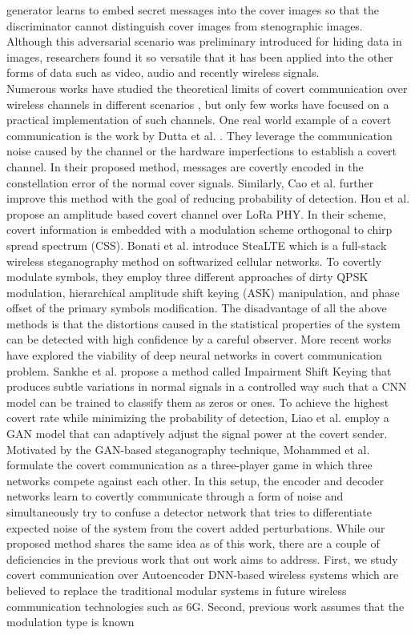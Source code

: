 generator learns to embed secret messages into the cover images so that the discriminator cannot distinguish cover images from stenographic images. Although this adversarial scenario was preliminary introduced for hiding data in images, researchers found it so versatile that it has been applied into the other forms of data such as video, audio and recently wireless signals.\\
Numerous works have studied the theoretical limits of covert communication over wireless channels in different scenarios \cite{bash2012square, soltani2018covert, sheikholeslami2018multi, li2021fundamental}, but only few works have focused on a practical implementation of such channels. One real world example of a covert communication is the work by Dutta et al. \cite{dutta2012secret}. They leverage the communication noise caused by the channel or the hardware imperfections to establish a covert channel. In their proposed method, messages are covertly encoded in the constellation error of the normal cover signals. Similarly, Cao et al. \cite{cao2018wireless} further improve this method with the goal of reducing probability of detection. Hou et al. \cite{hou2020cloaklora} propose an amplitude based covert channel over LoRa PHY. In their scheme, covert information is embedded with a modulation scheme orthogonal to chirp spread spectrum (CSS). Bonati et al. \cite{bonati2021stealte} introduce SteaLTE which is a full-stack wireless steganography method on softwarized cellular networks. To covertly modulate symbols, they employ three different approaches of dirty QPSK modulation, hierarchical amplitude shift keying (ASK) manipulation, and phase offset of the primary symbols modification. The disadvantage of all the above methods is that the distortions caused in the statistical properties of the system can be detected with high confidence by a careful observer. More recent works have explored the viability of deep neural networks in covert communication problem. Sankhe et al. \cite{sankhe2019impairment} propose a method called Impairment Shift Keying that produces subtle variations in normal signals in a controlled way such that a CNN model can be trained to classify them as zeros or ones. To achieve the highest covert rate while minimizing the probability of detection, Liao et al. \cite{liao2020generative} employ a GAN model that can adaptively adjust the signal power at the covert sender. Motivated by the GAN-based steganography technique, Mohammed et al. \cite{mohammed2021adversarial} formulate the covert communication as a three-player game in which three networks compete against each other. In this setup, the encoder and decoder networks learn to covertly communicate through a form of noise and simultaneously try to confuse a detector network that tries to differentiate expected noise of the system from the covert added perturbations. While our proposed method shares the same idea as of this work, there are a couple of deficiencies in the previous work that out work aims to address. First, we study covert communication over Autoencoder DNN-based wireless systems which are believed to replace the traditional modular systems in future wireless communication technologies such as 6G. Second, previous work assumes that the modulation type is known 